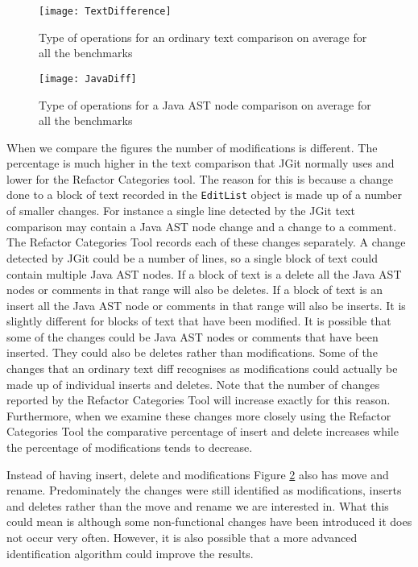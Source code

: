 \begin{figure}[p] 
 \begin{center}
 \texttt{[image: TextDifference]}
 \end{center}
 \caption{Type of operations for an ordinary text comparison on average for all the benchmarks}
 \label{fig:textDifference}
\end{figure}

\begin{figure}[p] 
 \begin{center}
 \texttt{[image: JavaDiff]}
 \end{center}
 \caption{Type of operations for a Java AST node comparison on average for all the benchmarks}
 \label{fig:javaDifference}
\end{figure}

When we compare the figures the number of modifications is different.
The percentage is much higher in the text comparison that JGit normally uses and lower for the Refactor Categories tool.
The reason for this is because a change done to a block of text recorded in the \lstinline{EditList} object is made up of a number of smaller changes.  
For instance a single line detected by the JGit text comparison may contain a Java AST node change and a change to a comment.
The Refactor Categories Tool records each of these changes separately.
A change detected by JGit could be a number of lines, so a single block of text could contain multiple Java AST nodes.  
If a block of text is a delete all the Java AST nodes or comments in that range will also be deletes. 
If a block of text is an insert all the Java AST node or comments in that range will also be inserts.
It is slightly different for blocks of text that have been modified.
It is possible that some of the changes could be Java AST nodes or comments that have been inserted.
They could also be deletes rather than modifications.
Some of the changes that an ordinary text diff recognises as modifications could actually be made up of individual inserts and deletes.
Note that the number of changes reported by the Refactor Categories Tool will increase exactly for this reason.
Furthermore, when we examine these changes more closely using the Refactor Categories Tool the comparative percentage of insert and delete increases while the percentage of modifications tends to decrease.  

Instead of having insert, delete and modifications Figure \ref{fig:javaDifference} also has move and rename.
Predominately the changes were still identified as modifications, inserts and deletes rather than the move and rename we are interested in.
What this could mean is although some non-functional changes have been introduced it does not occur very often.  
However, it is also possible that a more advanced identification algorithm could improve the results. 

